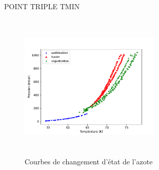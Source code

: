 POINT TRIPLE TMIN


\begin{figure}
    \centering
    \includegraphics[width=0.6\textwidth, height=7cm]{figures/etats_azote_clean.pdf}
    \caption{Courbes de changement d'état de l'azote}
    \label{fig:cleandata}
\end{figure}




